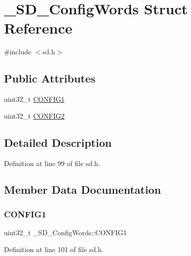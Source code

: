 \hypertarget{struct__SD__ConfigWords}{}\section{\+\_\+\+S\+D\+\_\+\+Config\+Words Struct Reference}
\label{struct__SD__ConfigWords}


{\ttfamily \#include $<$sd.\+h$>$}

\subsection*{Public Attributes}
\begin{DoxyCompactItemize}
\item 
uint32\+\_\+t \mbox{\hyperlink{struct__SD__ConfigWords_af173ced932ceb3bf0b4b36d39685972d}{C\+O\+N\+F\+I\+G1}}
\item 
uint32\+\_\+t \mbox{\hyperlink{struct__SD__ConfigWords_a1b103ccbc3b9c61ce75dd4a556738cc1}{C\+O\+N\+F\+I\+G2}}
\end{DoxyCompactItemize}


\subsection{Detailed Description}


Definition at line 99 of file sd.\+h.



\subsection{Member Data Documentation}
\mbox{\label{struct__SD__ConfigWords_af173ced932ceb3bf0b4b36d39685972d}} 
\subsubsection{\texorpdfstring{CONFIG1}{CONFIG1}}
{\footnotesize\ttfamily uint32\+\_\+t \+\_\+\+S\+D\+\_\+\+Config\+Words\+::\+C\+O\+N\+F\+I\+G1}



Definition at line 101 of file sd.\+h.

\mbox{\label{struct__SD__ConfigWords_a1b103ccbc3b9c61ce75dd4a556738cc1}} 
